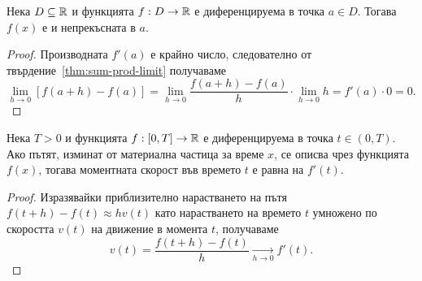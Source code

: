 \documentclass[numbers=endperiod, DIV=15, bibliography=totocnumbered]{scrartcl}
\begin{document}
\begin{proposition}
  Нека $D \subseteq \mathbb{R}$ и функцията $f: D \to \mathbb{R}$ е диференцируема в точка $a \in D$. Тогава $f(x)$ е и непрекъсната в $a$.
\end{proposition}
\begin{proof}
  Производната $f'(a)$ е крайно число, следователно от твърдение~\ref{thm:sum-prod-limit} получаваме
  \begin{displaymath}
    \lim_{h \to 0} [f(a+h) - f(a)]
    =
    \lim_{h \to 0} \frac {f(a+h) - f(a)} h \cdot \lim_{h \to 0} h
    =
    f'(a) \cdot 0
    =
    0.
  \end{displaymath}
\end{proof}

\begin{theorem}
  Нека $T > 0$ и функцията $f: [0, T] \to \mathbb{R}$ е диференцируема в точка $t \in (0, T)$. Ако пътят, изминат от материална частица за време $x$, се описва чрез функцията $f(x)$, тогава моментната скорост във времето $t$ е равна на $f'(t)$.
\end{theorem}
\begin{proof}
  Изразявайки приблизително нарастването на пътя $f(t+h) - f(t) \approx h v(t)$ като нарастването на времето $t$ умножено по скоростта $v(t)$ на движение в момента $t$, получаваме
  \begin{displaymath}
    v(t) = \frac{f(t+h) - f(t)} {h} \underset {h \to 0} \longrightarrow f'(t).
  \end{displaymath}
\end{proof}
\end{document}
